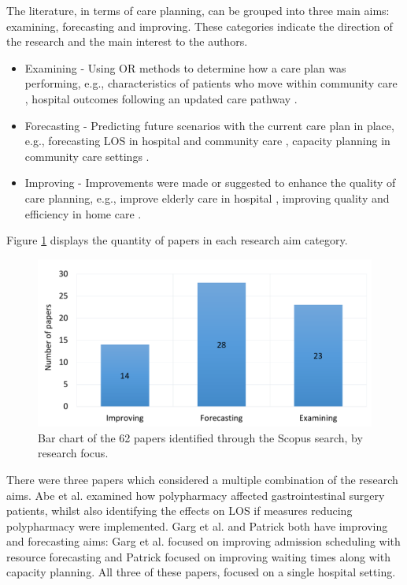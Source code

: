 \documentclass[../thesis.tex]{subfiles}
\begin{document}
The literature, in terms of care planning, can be grouped into three main aims: examining, forecasting and improving. These categories indicate the direction of the research and the main interest to the authors. 

\begin{itemize}
    \item Examining - Using OR methods to determine how a care plan was performing, e.g., characteristics of patients who move within community care \cite{Gassoumis}, hospital outcomes following an updated care pathway \cite{Wallace}.
    \item Forecasting - Predicting future scenarios with the current care plan in place, e.g., forecasting LOS in hospital and community care \cite{Gordon2}, capacity planning in community care settings \cite{Bidhandi}.
    \item Improving - Improvements were made or suggested to enhance the quality of care planning, e.g., improve elderly care in hospital \cite{Ragab}, improving quality and efficiency in home care \cite{Eveborn}.
\end{itemize}

Figure \ref{fig:Aims} displays the quantity of papers in each research aim category.

\begin{figure}[H]
\centering
    \includegraphics[scale = 0.3]{Chapter2/Figures/Focus1.pdf}
   \caption{Bar chart of the 62 papers identified through the Scopus search, by research focus.}
   \label{fig:Aims}
\end{figure}

There were three papers which considered a multiple combination of the research aims. Abe et al. \cite{Abe} examined how polypharmacy affected gastrointestinal surgery patients, whilst also identifying the effects on LOS if measures reducing polypharmacy were implemented. Garg et al. \cite{Garg2} and Patrick \cite{Patrick} both have improving and forecasting aims: Garg et al. focused on improving admission scheduling with resource forecasting and Patrick focused on improving waiting times along with capacity planning. All three of these papers, focused on a single hospital setting.
\end{document}
